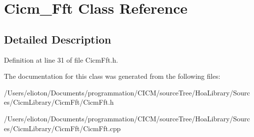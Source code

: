 \hypertarget{class_cicm___fft}{\section{Cicm\-\_\-\-Fft Class Reference}
\label{class_cicm___fft}
}


\subsection{Detailed Description}


Definition at line 31 of file Cicm\-Fft.\-h.



The documentation for this class was generated from the following files\-:\begin{DoxyCompactItemize}
\item 
/\-Users/elioton/\-Documents/programmation/\-C\-I\-C\-M/source\-Tree/\-Hoa\-Library/\-Sources/\-Cicm\-Library/\-Cicm\-Fft/Cicm\-Fft.\-h\item 
/\-Users/elioton/\-Documents/programmation/\-C\-I\-C\-M/source\-Tree/\-Hoa\-Library/\-Sources/\-Cicm\-Library/\-Cicm\-Fft/Cicm\-Fft.\-cpp\end{DoxyCompactItemize}
